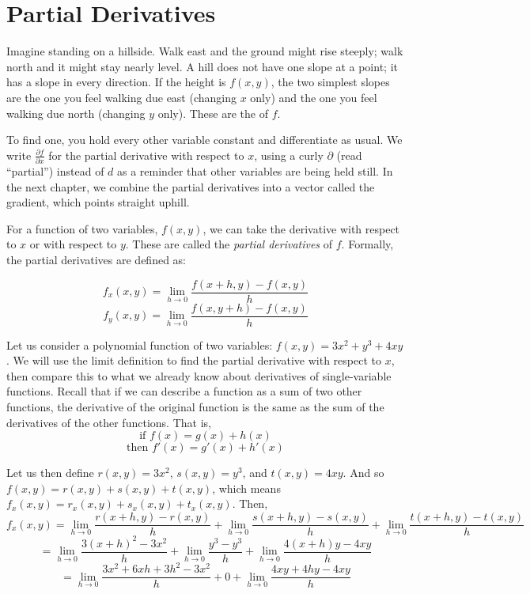 \chapter{Partial Derivatives}

Imagine standing on a hillside. Walk east and the ground might rise
steeply; walk north and it might stay nearly level. A hill does not have
one slope at a point; it has a slope in every direction. If the height is
$f(x, y)$, the two simplest slopes are the one you feel walking due east
(changing $x$ only) and the one you feel walking due north (changing $y$
only). These are the 
of $f$.

To find one, you hold every other variable constant and differentiate as
usual. We write $\frac{\partial f}{\partial x}$ for the partial derivative
with respect to $x$, using a curly $\partial$ (read ``partial'') instead
of $d$ as a reminder that other variables are being held still. In the
next chapter, we combine the partial derivatives into a vector called the
gradient, which points straight uphill.

For a function of two variables, $f(x,y)$, we can take the derivative with 
respect to $x$ or with respect to $y$. These are called the \textit{partial 
derivatives} of $f$. Formally, the partial 
derivatives are defined as:

\begin{mdframed}[style = important, frametitle = {Limit Definition of Partial 
Derivatives}]
$$f_x(x, y) = \lim_{h \to 0} \frac{f(x + h, y) - f(x, y)}{h}$$
$$f_y(x, y) = \lim_{h \to 0} \frac{f(x, y + h) - f(x, y)}{h}$$
\end{mdframed}

Let us consider a polynomial function of two variables: $f(x, y) = 3x^2 + y^3 + 
4xy$. We will use the limit definition to find the partial derivative with 
respect to $x$, then compare this to what we already know about derivatives of 
single-variable functions. Recall that if we can describe a function as a sum of 
two other functions, the derivative of the original function is the same as the 
sum of the derivatives of the other functions. That is, 
$$\text{if } f(x) = g(x) + h(x)$$
$$\text{then } f'(x) = g'(x) + h'(x)$$

Let us then define $r(x, y) = 3x^2$, $s(x, y) = y^3$, and $t(x, y) = 4xy$. And 
so $f(x, y) = r(x, y) + s(x, y) + t(x, y)$, which means $f_x(x, y) = r_x(x, y) 
+ s_x(x, y) + t_x(x, y)$. Then,
$$f_x(x, y) = \lim_{h \to 0} \frac{r(x + h, y) - r(x, y)}{h} + \lim_{h \to 0} 
\frac{s(x + h, y) - s(x, y)}{h} + \lim_{h \to 0} \frac{t(x + h, y) - t(x, y)}{
h}$$
$$= \lim_{h \to 0} \frac{3(x + h)^2 - 3x^2}{h} + \lim_{h \to 0} \frac{y^3 - 
y^3}{h} + \lim_{h \to 0} \frac{4(x + h)y - 4xy}{h}$$
$$= \lim_{h \to 0} \frac{3x^2 + 6xh + 3h^2 - 3x^2}{h} + 0 + \lim_{h \to 0} 
\frac{4xy + 4hy - 4xy}{h}$$

